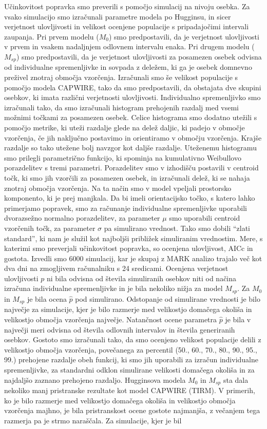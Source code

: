 Učinkovitost popravka smo preverili s pomočjo simulacij na nivoju osebka. Za vsako simulacijo smo izračunali parametre modela po Hugginsu, in sicer verjetnost ulovljivosti in velikost ocenjene populacije s pripadajočimi intervali zaupanja. Pri prvem modelu ($M_0$) smo predpostavili, da je verjetnost ulovljivosti v prvem in vsakem nadaljnjem odlovnem intervalu enaka. Pri drugem modelu ($M_{sp}$) smo predpostavili, da je verjetnost ulovljivosti za posamezen osebek odvisna od individualne spremenljivke in sovpada z deležem, ki ga je osebek domnevno preživel znotraj območja vzorčenja. Izračunali smo še velikost populacije s pomočjo modela CAPWIRE, tako da smo predpostavili, da obstajata dve skupini osebkov, ki imata različni verjetnosti ulovljivosti. Individualno spremenljivko smo izračunali tako, da smo izračunali histogram prehojenih razdalj med vsemi možnimi točkami za posamezen osebek. Celice histograma smo dodatno utežili s pomočjo metrike, ki uteži razdalje glede na delež daljic, ki padejo v območje vzorčenja, če jih naključno postavimo in orientiramo v območju vzorčenja. Krajše razdalje so tako utežene bolj navzgor kot daljše razdalje. Uteženemu histogramu smo prilegli parametrično funkcijo, ki spominja na kumulativno Weibullovo porazdelitev s tremi parametri. Porazdelitev smo v izhodišču postavili v centroid točk, ki smo jih vzorčili za posamezen osebek, in izračunali delež, ki se nahaja znotraj območja vzorčenja. Na ta način smo v model vpeljali prostorsko komponento, ki je prej manjkala. Da bi imeli orientacijsko točko, s katero lahko primerjamo popravek, smo za računanje individualne spremenljivke uporabili dvorazsežno normalno porazdelitev, za parameter $\mu$ smo uporabili centroid vzorčenih točk, za parameter $\sigma$ pa simulirano vrednost. Tako smo dobili ``zlati standard'', ki nam je služil kot najboljši približek simuliranim vrednostim. Mere, s katerimi smo preverjali učinkovitost popravka, so ocenjena ulovljivost, AICc in gostota. Izvedli smo 6000 simulacij, kar je skupaj z MARK analizo trajalo več kot dva dni na zmogljivem računalniku s 24 sredicami. Ocenjena verjetnost ulovljivosti $p$ ni bila odvisna od števila simuliranih osebkov niti od načina izračuna individualne spremenljivke in je bila nekoliko nižja za model $M_{sp}$. Za $M_0$ in $M_{sp}$ je bila ocena $\hat{p}$ pod simulirano. Odstopanje od simulirane vrednosti je bilo največje za simulacije, kjer je bilo razmerje med velikostjo domačega okoliša in velikostjo območja vzorčenja največje. Natančnost ocene parametra $\hat{p}$ je bila v največji meri odvisna od števila odlovnih intervalov in števila generiranih osebkov. Gostoto smo izračunali tako, da smo ocenjeno velikost populacije delili z velikostjo območja vzorčenja, povečanega za percentil (50., 60., 70., 80., 90., 95., 99.) prehojene razdalje obeh funkcij, ki smo jih uporabili za izračun individualne spremenljivke, za standardni odklon simulirane velikosti domačega okoliša in za najdaljšo zaznano prehojeno razdaljo. Hugginsova modela $M_0$ in $M_{sp}$ sta dala nekoliko manj pristranske rezultate kot model CAPWIRE (TIRM). V primerih, ko je bilo razmerje med velikostjo domačega okoliša in velikostjo območja vzorčenja majhno, je bila pristranskost ocene gostote najmanjša, z večanjem tega razmerja pa je strmo naraščala. Za simulacije, kjer je bil 